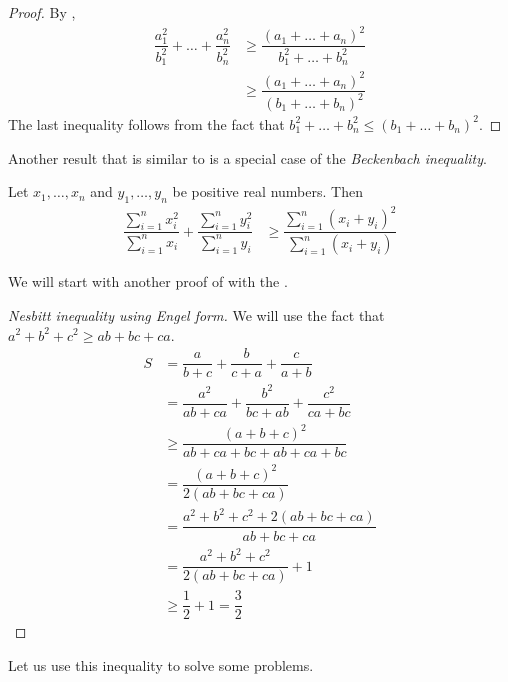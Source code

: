 \documentclass{subfile}
\begin{document}
		\begin{proof}
			By ,
				\begin{align*}
					\dfrac{a_1^2}{b_1^2}+\ldots+\dfrac{a_n^2}{b_n^2}
						& \geq\dfrac{(a_1+\ldots+a_n)^2}{b_1^2+\ldots+b_n^2}\\
						& \geq\dfrac{(a_1+\ldots+a_n)^2}{(b_1+\ldots+b_n)^2}
				\end{align*}
			The last inequality follows from the fact that $b_1^2+\ldots+b_n^2\leq(b_1+\ldots+b_n)^2$.
		\end{proof}
	Another result that is similar to  is a special case of the \textit{Beckenbach inequality}.
		\begin{theorem}
			Let $x_{1},\ldots,x_{n}$ and $y_{1},\ldots,y_{n}$ be positive real numbers. Then
				\begin{align*}
					\dfrac{\sum_{i=1}^{n}x_{i}^{2}}{\sum_{i=1}^{n}x_{i}}+\dfrac{\sum_{i=1}^{n}y_{i}^{2}}{\sum_{i=1}^{n}y_{i}}
						& \geq \dfrac{\sum_{i=1}^{n}(x_{i}+y_{i})^{2}}{\sum_{i=1}^{n}(x_{i}+y_{i})}
				\end{align*}
		\end{theorem}
	We will start with another proof of  with the .
		\begin{proof}[Nesbitt inequality using Engel form]
			We will use the fact that $a^2+b^2+c^2\geq ab+bc+ca$.
				\begin{align*}
					S
						& = \dfrac{a}{b+c}+\dfrac{b}{c+a}+\dfrac{c}{a+b}\\
						& = \dfrac{a^2}{ab+ca}+\dfrac{b^2}{bc+ab}+\dfrac{c^2}{ca+bc}\\
						& \geq\dfrac{(a+b+c)^2}{ab+ca+bc+ab+ca+bc}\\
						& = \dfrac{(a+b+c)^2}{2(ab+bc+ca)}\\
						& = \dfrac{a^2+b^2+c^2+2(ab+bc+ca)}{ab+bc+ca}\\
						& = \dfrac{a^2+b^2+c^2}{2(ab+bc+ca)}+1\\
						& \geq\dfrac{1}{2}+1=\dfrac{3}{2}
				\end{align*}
		\end{proof}
	Let us use this inequality to solve some problems.
\end{document}

